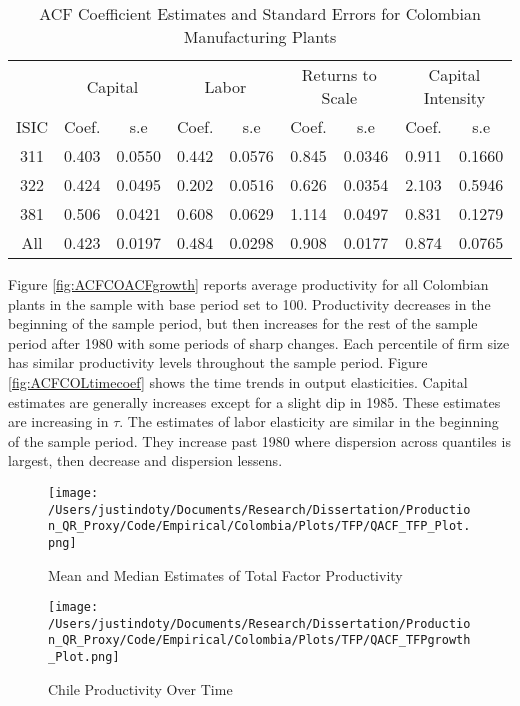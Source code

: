 \documentclass[11pt]{article}
\begin{document}
\begin{table}[H]
\centering
\caption{ACF Coefficient Estimates and Standard Errors for Colombian Manufacturing Plants}
\begin{tabular}{ccccccccc}
  \hline\hline & \multicolumn{2}{c}{Capital} & \multicolumn{2}{c}{Labor} & \multicolumn{2}{c}{Returns to Scale} & \multicolumn{2}{c}{Capital Intensity}\\ \cmidrule(lr){2-3} \cmidrule(lr){4-5} \cmidrule(lr){6-7} \cmidrule(lr){8-9}ISIC & Coef. & s.e & Coef. & s.e & Coef. & s.e & Coef. & s.e \\ 
  \hline
311 & 0.403 & 0.0550 & 0.442 & 0.0576 & 0.845 & 0.0346 & 0.911 & 0.1660 \\ 
  322 & 0.424 & 0.0495 & 0.202 & 0.0516 & 0.626 & 0.0354 & 2.103 & 0.5946 \\ 
  381 & 0.506 & 0.0421 & 0.608 & 0.0629 & 1.114 & 0.0497 & 0.831 & 0.1279 \\ 
  All & 0.423 & 0.0197 & 0.484 & 0.0298 & 0.908 & 0.0177 & 0.874 & 0.0765 \\ 
   \hline
\end{tabular}
\label{CHLACFCoef}
\end{table}

Figure \ref{fig:ACFCOACFgrowth} reports average productivity for all Colombian plants in the sample with base period set to 100. Productivity decreases in the beginning of the sample period, but then increases for the rest of the sample period after 1980 with some periods of sharp changes. Each percentile of firm size has similar productivity levels throughout the sample period. Figure \ref{fig:ACFCOLtimecoef} shows the time trends in output elasticities. Capital estimates are generally increases except for a slight dip in 1985. These estimates are increasing in $\tau$. The estimates of labor elasticity are similar in the beginning of the sample period. They increase past 1980 where dispersion across quantiles is largest, then decrease and dispersion lessens.

\begin{figure}[H]
\centering
\caption{Mean and Median Estimates of Total Factor Productivity}
\texttt{[image: /Users/justindoty/Documents/Research/Dissertation/Production\_QR\_Proxy/Code/Empirical/Colombia/Plots/TFP/QACF\_TFP\_Plot.png]}
\label{fig:ACFCOLTFPDens}
\end{figure}

\begin{figure}[H]
\centering
\caption{Chile Productivity Over Time}
\texttt{[image: /Users/justindoty/Documents/Research/Dissertation/Production\_QR\_Proxy/Code/Empirical/Colombia/Plots/TFP/QACF\_TFPgrowth\_Plot.png]}
\label{fig:ACFCOLpgrowth}
\end{figure}
\end{document}
